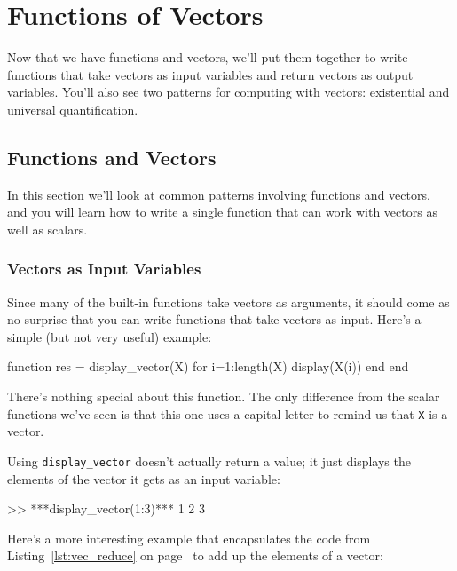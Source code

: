 \chapter{Functions of Vectors}

Now that we have functions and vectors, we'll put them together to write functions that take vectors as input variables and return vectors as output variables.  You'll also see two patterns for computing with vectors: existential and universal quantification.


\section{Functions and Vectors}

In this section we'll look at common patterns involving functions and vectors, and you will learn how to write a single function that can work with \mbox{vectors} as well as scalars.

\subsection{Vectors as Input Variables}

Since many of the built-in functions take vectors as arguments,
it should come as no surprise that you can write functions that
take vectors as input.  Here's a simple (but not very useful) example:


\begin{code}
function res = display_vector(X)
    for i=1:length(X)
        display(X(i))
    end
end
\end{code}

There's nothing special about this function.  The only
difference from the scalar functions we've seen is that this one uses
a capital letter to remind us that \lstinline{X} is a vector.

Using \lstinline{display_vector} doesn't actually return a value; it just displays the elements of the vector it gets as an input variable:

\begin{code}
>> ***display_vector(1:3)***
    1
    2
    3
\end{code}

Here's a more interesting example that encapsulates the code
from Listing~\ref{lst:vec_reduce} on page~\pageref{lst:vec_reduce} to add up the elements of a vector:

